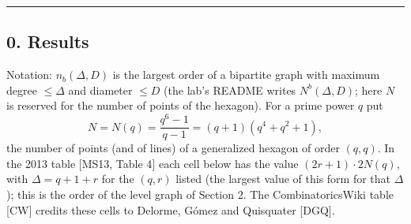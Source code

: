 \documentclass[
  11pt,
]{article}
\begin{document}
\begin{center}\rule{0.5\linewidth}{0.5pt}\end{center}

\hypertarget{results}{%
\subsection{0. Results}\label{results}}

Notation: \(n_b(\Delta, D)\) is the largest order of a bipartite graph with maximum degree \(\le \Delta\) and diameter
\(\le D\) (the lab's README writes \(N^b(\Delta,D)\); here \(N\) is reserved for the number of points of the hexagon).
For a prime power \(q\) put \[N = N(q) = \frac{q^6-1}{q-1} = (q+1)(q^4+q^2+1),\] the number of points (and of lines) of
a generalized hexagon of order \((q,q)\). In the 2013 table {[}MS13, Table 4{]} each cell below has the value
\((2r+1)\cdot 2N(q)\), with \(\Delta = q+1+r\) for the \((q,r)\) listed (the largest value of this form for that
\(\Delta\)); this is the order of the level graph of Section 2. The CombinatoricsWiki table {[}CW{]} credits these cells
to Delorme, Gómez and Quisquater {[}DGQ{]}.
\end{document}
